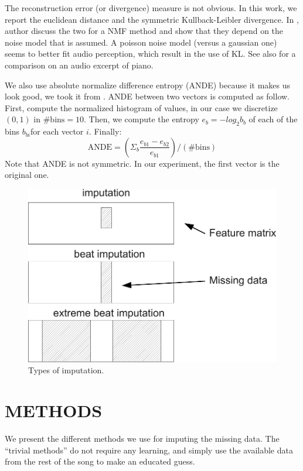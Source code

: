 \documentclass{article}
\begin{document}
The reconstruction error (or divergence) measure is not obvious. In this work,
we report the euclidean distance and the symmetric Kullback-Leibler divergence.
In \cite{Sajda2003}, author discuss the two for
a NMF method and show that they depend on the noise model that is assumed.
A poisson noise model (versus a gaussian one) seems to better fit audio perception, 
which result in the use of KL. See also \cite{Fevotte2009} for a comparison on an
audio excerpt of piano.

We also use absolute normalize difference entropy (ANDE) because it makes us look good, 
we took it from \cite{Mentzelopoulos2004}.
ANDE between two vectors is computed as follow. First, compute the normalized histogram 
of values, in our case we discretize $(0,1)$ in $\mbox{\# bins} = 10$. 
Then, we compute the entropy
$e_b = - log_2 b_b$ of each of the bins $b_{bi}$for each vector $i$. Finally:
\[
\mbox{ANDE} = \left( \Sigma_b \frac{e_{b1} - e_{b2}}{e_{b1}} \right) / (\mbox{\# bins})
\]
Note that ANDE is not symmetric. In our experiment, the first vector is the original one.

\begin{figure}[t]
\begin{center}
\includegraphics[width=.9\columnwidth]{type_imputation}
\end{center}
\caption{Types of imputation.}
\label{fig:typeimputation}
\end{figure}

\section{METHODS}
\label{sec:methods}
We present the different methods we use for imputing the missing data.
The ``trivial methods'' do not require any learning, and simply use the available
data from the rest of the song to make an educated guess.
\end{document}
